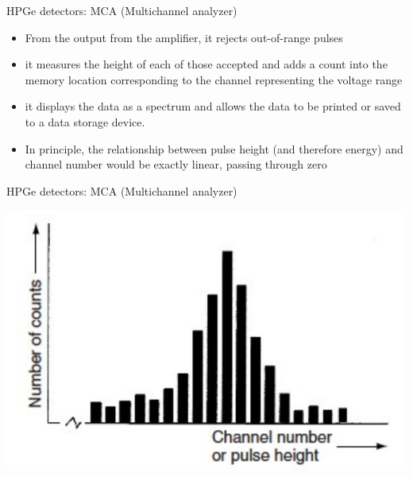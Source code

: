 \begin{frame}{HPGe detectors: MCA (Multichannel analyzer)}


{\small 
\begin{itemize}
\item From the output from the amplifier, it rejects out-of-range pulses
\item it measures the height of each of those accepted and adds a count into the memory location corresponding to the channel representing the voltage range
\item it displays the data as a spectrum and allows the data to be printed or saved to a data storage device.
\item In principle, the relationship between pulse height (and therefore energy) and channel number would be exactly linear, passing through zero
\end{itemize}
}



\end{frame}

\begin{frame}{HPGe detectors: MCA (Multichannel analyzer)}

\centering
\includegraphics[scale=0.5]{figures/mca.png}

\end{frame}

